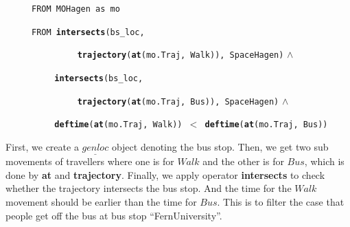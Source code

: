 \begin{itemize}
$\hspace{1cm}$ \texttt{FROM MOHagen as mo}

$\hspace{1cm}$ \texttt{FROM \textbf{intersects}(bs\_loc,}

$\hspace{3cm}$ \texttt{\textbf{trajectory}(\textbf{at}(mo.Traj, Walk)), SpaceHagen)} $\wedge$ 

$\hspace{2cm}$ \texttt{\textbf{intersects}(bs\_loc,}

$\hspace{3cm}$ \texttt{\textbf{trajectory}(\textbf{at}(mo.Traj, Bus)), SpaceHagen)} $\wedge$ 

$\hspace{2cm}$ \texttt{\textbf{deftime}(\textbf{at}(mo.Traj, Walk)) $<$  \textbf{deftime}(\textbf{at}(mo.Traj, Bus))}

\end{itemize}

First, we create a $\underline{genloc}$ object denoting the bus stop. Then, we get two sub movements of travellers where one is for $Walk$ and the other is for $Bus$, which is done by \textbf{at} and \textbf{trajectory}. Finally, we apply  operator \textbf{intersects} to check whether the trajectory intersects the bus stop. And the time for the $Walk$ movement should be earlier than the time for $Bus$. This is to filter the case that people get off the bus at bus stop ``FernUniversity''. \\


